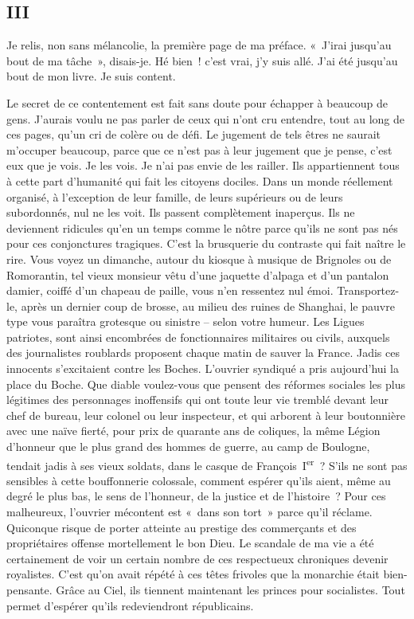 \documentclass[french,twoside]{book} %
\begin{document}
\subsection[{III}]{III}
\noindent Je relis, non sans mélancolie, la première page de ma préface. « J’irai jusqu’au bout de ma tâche », disais-je. Hé bien ! c’est vrai, j’y suis allé. J’ai été jusqu’au bout de mon livre. Je suis content.\par
Le secret de ce contentement est fait sans doute pour échapper à beaucoup de gens. J’aurais voulu ne pas parler de ceux qui n’ont cru entendre, tout au long de ces pages, qu’un cri de colère ou de défi. Le jugement de tels êtres ne saurait m’occuper beaucoup, parce que ce n’est pas à leur jugement que je pense, c’est eux que je vois. Je les vois. Je n’ai pas envie de les railler. Ils appartiennent tous à cette part d’humanité qui fait les citoyens dociles. Dans un monde réellement organisé, à l’exception de leur famille, de leurs supérieurs ou de leurs subordonnés, nul ne les voit. Ils passent complètement inaperçus. Ils ne deviennent ridicules qu’en un temps comme le nôtre parce qu’ils ne sont pas nés pour ces conjonctures tragiques. C’est la brusquerie du contraste qui fait naître le rire. Vous voyez un dimanche, autour du kiosque à musique de Brignoles ou de Romorantin, tel vieux monsieur vêtu d’une jaquette d’alpaga et d’un pantalon damier, coiffé d’un chapeau de paille, vous n’en ressentez nul émoi. Transportez-le, après un dernier coup de brosse, au milieu des ruines de Shanghai, le pauvre type vous paraîtra grotesque ou sinistre – selon votre humeur. Les Ligues patriotes, sont ainsi encombrées de fonctionnaires militaires ou civils, auxquels des journalistes roublards proposent chaque matin de sauver la France. Jadis ces innocents s’excitaient contre les Boches. L’ouvrier syndiqué a pris aujourd’hui la place du Boche. Que diable voulez-vous que pensent des réformes sociales les plus légitimes des personnages inoffensifs qui ont toute leur vie tremblé devant leur chef de bureau, leur colonel ou leur inspecteur, et qui arborent à leur boutonnière avec une naïve fierté, pour prix de quarante ans de coliques, la même Légion d’honneur que le plus grand des hommes de guerre, au camp de Boulogne, tendait jadis à ses vieux soldats, dans le casque de François \textsc{I}\textsuperscript{er} ? S’ils ne sont pas sensibles à cette bouffonnerie colossale, comment espérer qu’ils aient, même au degré le plus bas, le sens de l’honneur, de la justice et de l’histoire ? Pour ces malheureux, l’ouvrier mécontent est « dans son tort » parce qu’il réclame. Quiconque risque de porter atteinte au prestige des commerçants et des propriétaires offense mortellement le bon Dieu. Le scandale de ma vie a été certainement de voir un certain nombre de ces respectueux chroniques devenir royalistes. C’est qu’on avait répété à ces têtes frivoles que la monarchie était bien-pensante. Grâce au Ciel, ils tiennent maintenant les princes pour socialistes. Tout permet d’espérer qu’ils redeviendront républicains.\par
\end{document}
